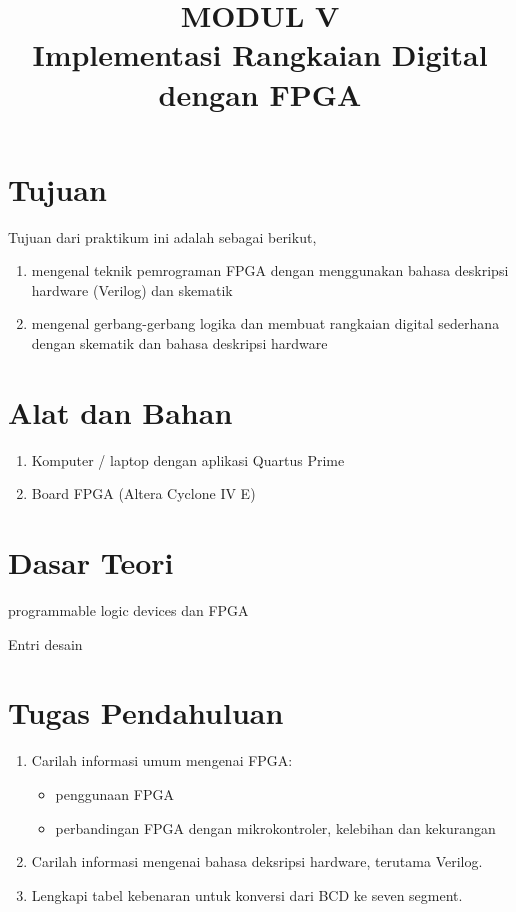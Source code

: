 \documentclass[a4paper,12pt,bahasa]{extarticle}
\begin{document}
\title{MODUL V \\
Implementasi Rangkaian Digital dengan FPGA}
\author{}
\date{}
\maketitle

\section{Tujuan}

Tujuan dari praktikum ini adalah sebagai berikut,
\begin{enumerate}
\item mengenal teknik pemrograman FPGA dengan menggunakan bahasa deskripsi hardware (Verilog)
dan skematik
\item mengenal gerbang-gerbang logika dan membuat rangkaian digital sederhana dengan
skematik dan bahasa deskripsi hardware
\end{enumerate}



\section{Alat dan Bahan}

\begin{enumerate}
\item Komputer / laptop dengan aplikasi Quartus Prime
\item Board FPGA (Altera Cyclone IV E)
\end{enumerate}

\section{Dasar Teori}

programmable logic devices dan FPGA

Entri desain








\section{Tugas Pendahuluan}

\begin{enumerate}

\item Carilah informasi umum mengenai FPGA:
\begin{itemize}
\item penggunaan FPGA
\item perbandingan FPGA dengan mikrokontroler, kelebihan dan kekurangan
\end{itemize}

\item Carilah informasi mengenai bahasa deksripsi hardware, terutama Verilog.

\item Lengkapi tabel kebenaran untuk konversi dari BCD ke seven segment.
\end{enumerate}
\end{document}
